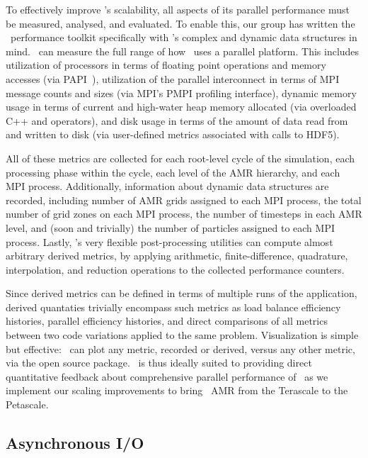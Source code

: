 \documentclass{article}
\begin{document}
 To effectively improve \enzo's scalability, all aspects of its
 parallel performance must be measured, analysed, and evaluated.  To
 enable this, our group has written the \lcaperf\ performance toolkit
 specifically with \enzo's complex and dynamic data structures in
 mind.  \lcaperf\ can measure the full range of how \enzo\ uses a
 parallel platform.  This includes utilization of processors in terms
 of floating point operations and memory accesses (via
 PAPI~\cite{BrDo00}), utilization of the parallel interconnect in
 terms of MPI message counts and sizes (via MPI's PMPI profiling
 interface), dynamic memory usage in terms of current and high-water
 heap memory allocated (via overloaded C++  and
  operators), and disk usage in terms of the amount of
 data read from and written to disk (via user-defined metrics
 associated with calls to HDF5).  

 All of these metrics are collected for each root-level cycle of the
 simulation, each processing phase within the cycle, each level of the
 AMR hierarchy, and each MPI process.  Additionally, information about
 dynamic data structures are recorded, including number of AMR grids
 assigned to each MPI process, the total number of grid zones on each
 MPI process, the number of timesteps in each AMR level, and (soon and
 trivially) the number of particles assigned to each MPI process.
 Lastly, \lcaperf's very flexible post-processing utilities can
 compute almost arbitrary derived metrics, by applying arithmetic,
 finite-difference, quadrature, interpolation, and reduction
 operations to the collected performance counters.  

 Since derived metrics can be defined in terms of multiple runs of the
 application, derived quantaties trivially encompass such metrics as
 load balance efficiency histories, parallel efficiency histories, and
 direct comparisons of all metrics between two code variations applied
 to the same problem.  Visualization is simple but effective:
 \lcaperf\ can plot any metric, recorded or derived, versus any other
 metric, via the open source  package.  \lcaperf\ is
 thus ideally suited to providing direct quantitative feedback about
 comprehensive parallel performance of \enzo\ as we implement our
 scaling improvements to bring \enzo\ AMR from the Terascale to the
 Petascale.

\subsection{Asynchronous I/O} \label{solution:data-io-asynch}
\end{document}
